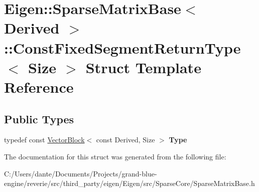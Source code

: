 \hypertarget{struct_eigen_1_1_sparse_matrix_base_1_1_const_fixed_segment_return_type}{}\section{Eigen\+::Sparse\+Matrix\+Base$<$ Derived $>$\+::Const\+Fixed\+Segment\+Return\+Type$<$ Size $>$ Struct Template Reference}
\label{struct_eigen_1_1_sparse_matrix_base_1_1_const_fixed_segment_return_type}
\subsection*{Public Types}
\begin{DoxyCompactItemize}
\item 
\mbox{\label{struct_eigen_1_1_sparse_matrix_base_1_1_const_fixed_segment_return_type_acae60bb4d8a51170372941a2b1b3e409}} 
typedef const \mbox{\hyperlink{class_eigen_1_1_vector_block}{Vector\+Block}}$<$ const Derived, Size $>$ {\bfseries Type}
\end{DoxyCompactItemize}


The documentation for this struct was generated from the following file\+:\begin{DoxyCompactItemize}
\item 
C\+:/\+Users/dante/\+Documents/\+Projects/grand-\/blue-\/engine/reverie/src/third\+\_\+party/eigen/\+Eigen/src/\+Sparse\+Core/Sparse\+Matrix\+Base.\+h\end{DoxyCompactItemize}
